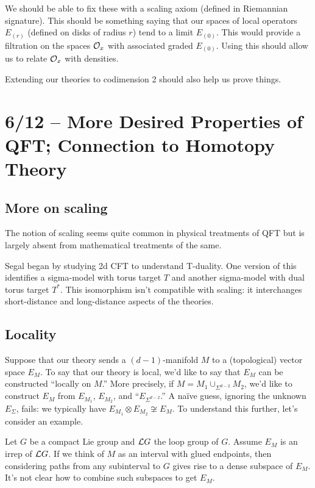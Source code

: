 We should be able to fix these with a scaling axiom (defined in Riemannian signature).
This should be something saying that our spaces of local operators $E_{(r)}$ (defined on disks of radius $r$) tend to a limit $E_{(0)}$.
This would provide a filtration on the spaces $\mathcal{O}_x$ with associated graded $E_{(0)}$.
Using this should allow us to relate $\mathcal{O}_x$ with densities.

Extending our theories to codimension 2 should also help us prove things.

\section{6/12 -- More Desired Properties of QFT; Connection to Homotopy Theory}

\subsection{More on scaling}

The notion of scaling seems quite common in physical treatments of QFT but is largely absent from mathematical treatments of the same.

Segal began by studying 2d CFT to understand T-duality.
One version of this identifies a sigma-model with torus target $T$ and another sigma-model with dual torus target $T^*$.
This isomorphism isn't compatible with scaling: it interchanges short-distance and long-distance aspects of the theories.

\subsection{Locality}

Suppose that our theory sends a $(d-1)$-manifold $M$ to a (topological) vector space $E_M$.
To say that our theory is local, we'd like to say that $E_M$ can be constructed ``locally on $M$.''
More precisely, if $M = M_1 \cup_{\Sigma^{d-2}} M_2$, we'd like to construct $E_M$ from $E_{M_1}$, $E_{M_2}$, and ``$E_{\Sigma^{d-2}}$.''
A na\"ive guess, ignoring the unknown $E_{\Sigma}$, fails: we typically have $E_{M_1} \otimes E_{M_2} \not\cong E_M$.
To understand this further, let's consider an example.

\begin{ex}
	Let $G$ be a compact Lie group and $\mathcal{L} G$ the loop group of $G$.
	Assume $E_M$ is an irrep of $\mathcal{L} G$.
	If we think of $M$ as an interval with glued endpoints, then considering paths from any subinterval to $G$ gives rise to a dense subspace of $E_M$.
	It's not clear how to combine such subspaces to get $E_M$.
\end{ex}

